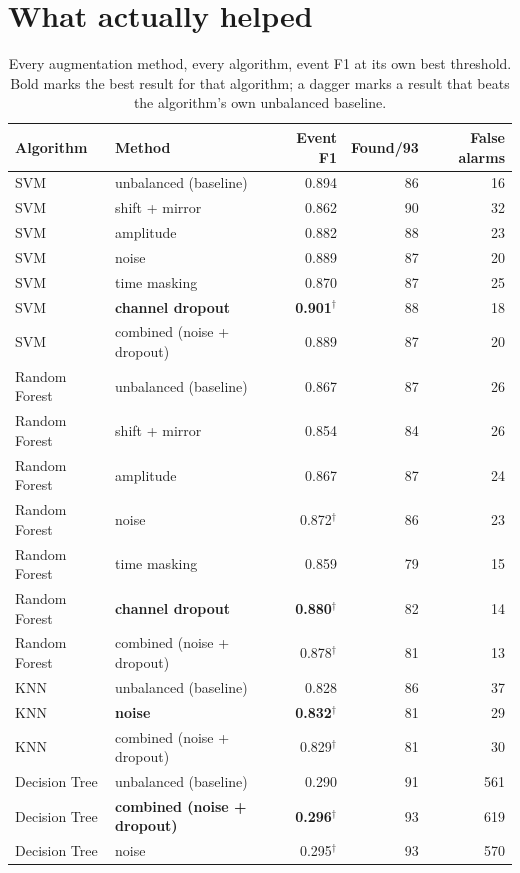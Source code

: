 \section{What actually helped}

\begin{table}[H]
  \centering
  \small
  \caption{Every augmentation method, every algorithm, event F1 at its own best threshold.
    Bold marks the best result for that algorithm; a dagger marks a result that beats the
    algorithm's own unbalanced baseline.}
  \label{tab:augmentation-full}
  \begin{tabular}{llrrr}
    \toprule
    Algorithm & Method & Event F1 & Found/93 & False alarms \\
    \midrule
    SVM & unbalanced (baseline) & 0.894 & 86 & 16 \\
    SVM & shift + mirror & 0.862 & 90 & 32 \\
    SVM & amplitude & 0.882 & 88 & 23 \\
    SVM & noise & 0.889 & 87 & 20 \\
    SVM & time masking & 0.870 & 87 & 25 \\
    SVM & \textbf{channel dropout} & \textbf{0.901}$^\dagger$ & 88 & 18 \\
    SVM & combined (noise + dropout) & 0.889 & 87 & 20 \\
    \midrule
    Random Forest & unbalanced (baseline) & 0.867 & 87 & 26 \\
    Random Forest & shift + mirror & 0.854 & 84 & 26 \\
    Random Forest & amplitude & 0.867 & 87 & 24 \\
    Random Forest & noise & 0.872$^\dagger$ & 86 & 23 \\
    Random Forest & time masking & 0.859 & 79 & 15 \\
    Random Forest & \textbf{channel dropout} & \textbf{0.880}$^\dagger$ & 82 & 14 \\
    Random Forest & combined (noise + dropout) & 0.878$^\dagger$ & 81 & 13 \\
    \midrule
    KNN & unbalanced (baseline) & 0.828 & 86 & 37 \\
    KNN & \textbf{noise} & \textbf{0.832}$^\dagger$ & 81 & 29 \\
    KNN & combined (noise + dropout) & 0.829$^\dagger$ & 81 & 30 \\
    \midrule
    Decision Tree & unbalanced (baseline) & 0.290 & 91 & 561 \\
    Decision Tree & \textbf{combined (noise + dropout)} & \textbf{0.296}$^\dagger$ & 93 & 619 \\
    Decision Tree & noise & 0.295$^\dagger$ & 93 & 570 \\
    \bottomrule
  \end{tabular}
\end{table}

